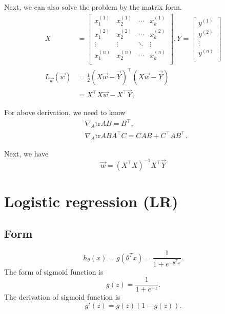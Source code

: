 \documentclass[10pt,onecolumn]{book}
\begin{document}
Next, we can also solve the problem by the matrix form.
\begin{equation}
\begin{split}
X  & = \left[
 \begin{matrix}
   x^{(1)}_1 & x^{(1)}_2 & \cdots & x^{(1)}_k \\
   x^{(2)}_1 & x^{(2)}_2 & \cdots & x^{(2)}_k \\
   \vdots & \vdots & \ddots & \vdots \\
   x^{(n)}_1 & x^{(n)}_2 & \cdots & x^{(n)}_k \\
  \end{matrix}
  \right],
Y = \left[
	\begin{matrix}
	y^{(1)} \\
	y^{(2)} \\
	\vdots \\
	y^{(n)} \\
	\end{matrix}
	\right] \\
L_{\vec{w}}(\vec{w}) & = \frac{1}{2}(X\vec{w} - \vec{Y})^\top (X\vec{w} - \vec{Y}) \\
			& = X^\top X \vec{w} - X^\top \vec{Y}, 
\end{split}
\end{equation}

For above derivation, we need to know
\begin{equation}
\begin{split}
& \nabla_{A} \text{tr}AB = B^\top, \\
& \nabla_{A} \text{tr}AB A^\top C = CAB + C^\top A B^\top.
\end{split}
\end{equation}

Next, we have 
\begin{equation}
\vec{w} = (X^\top X)^{-1} X^\top \vec{Y}
\end{equation}

\section{Logistic regression (LR)}
\subsection{Form}
\begin{equation}
h_\theta(x) = g(\theta^T x)= \frac{1}{1 + e^{-\theta^T x}}.
\end{equation}
The form of sigmoid function is 
\begin{equation}
g(z) = \frac{1}{1 + e^{-z}}.
\end{equation}
The derivation of sigmoid function is 
\begin{equation}
g'(z) = g(z)(1-g(z)).
\end{equation}
\end{document}

